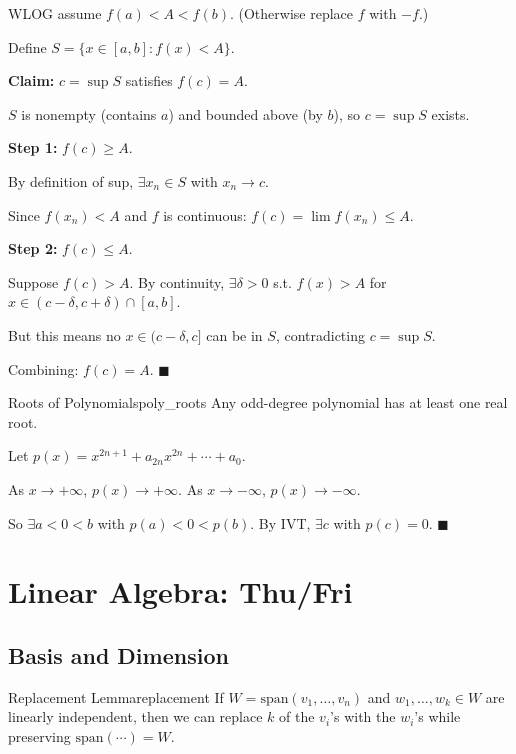 \documentclass[11pt, letterpaper, openany]{book}
\renewenvironment{proof}[1][\proofname]{%
  \tcolorbox[blanker, breakable, left=1em,
    before skip=1em, after skip=1em,
    borderline west={2pt}{0pt}{MagicTeal!50},
    colback=MagicCream,
    before upper={\textcolor{MagicTeal}{\sffamily\bfseries #1.}\space}
  ]%
}{%
  \hfill\textcolor{MagicTeal}{\ensuremath{\blacksquare}}\endtcolorbox%
}
\begin{document}
\begin{proof}
WLOG assume $f(a) < A < f(b)$. (Otherwise replace $f$ with $-f$.)

Define $S = \{x \in [a,b] : f(x) < A\}$.

\textbf{Claim:} $c = \sup S$ satisfies $f(c) = A$.

$S$ is nonempty (contains $a$) and bounded above (by $b$), so $c = \sup S$ exists.

\textbf{Step 1:} $f(c) \geq A$.

By definition of sup, $\exists x_n \in S$ with $x_n \to c$.

Since $f(x_n) < A$ and $f$ is continuous: $f(c) = \lim f(x_n) \leq A$.

\textbf{Step 2:} $f(c) \leq A$.

Suppose $f(c) > A$. By continuity, $\exists \delta > 0$ s.t. $f(x) > A$ for $x \in (c - \delta, c + \delta) \cap [a,b]$.

But this means no $x \in (c - \delta, c]$ can be in $S$, contradicting $c = \sup S$.

Combining: $f(c) = A$.
\end{proof}

\begin{cor}{Roots of Polynomials}{poly_roots}
Any odd-degree polynomial has at least one real root.
\end{cor}

\begin{proof}
Let $p(x) = x^{2n+1} + a_{2n}x^{2n} + \cdots + a_0$.

As $x \to +\infty$, $p(x) \to +\infty$. As $x \to -\infty$, $p(x) \to -\infty$.

So $\exists a < 0 < b$ with $p(a) < 0 < p(b)$. By IVT, $\exists c$ with $p(c) = 0$.
\end{proof}

\section{Linear Algebra: Thu/Fri}

\subsection{Basis and Dimension}

\begin{lem}{Replacement Lemma}{replacement}
If $W = \text{span}(v_1, \ldots, v_n)$ and $w_1, \ldots, w_k \in W$ are linearly independent, then we can replace $k$ of the $v_i$'s with the $w_i$'s while preserving $\text{span}(\cdots) = W$.
\end{lem}
\end{document}
